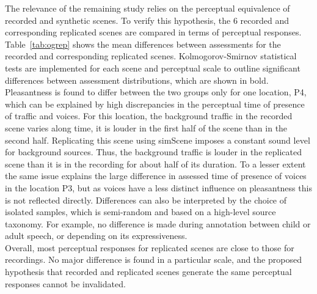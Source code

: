 \documentclass[11pt,a4paper]{article}
\begin{document}
The relevance of the remaining study relies on the perceptual equivalence of recorded and synthetic scenes. To verify this hypothesis, the 6 recorded and corresponding replicated scenes are compared in terms of perceptual responses.\\

Table~\ref{tab:ogrep} shows the mean differences between assessments for the recorded and corresponding replicated scenes. Kolmogorov-Smirnov statistical tests are implemented for each scene and perceptual scale to outline significant differences between assessment distributions, which are shown in bold. Pleasantness is found to differ between the two groups only for one location, P4, which can be explained by high discrepancies in the perceptual time of presence of traffic and voices. For this location, the background traffic in the recorded scene varies along time, it is louder in the first half of the scene than in the second half. Replicating this scene using simScene imposes a constant sound level for background sources. Thus, the background traffic is louder in the replicated scene than it is in the recording for about half
of its duration. To a lesser extent the same issue explains the large difference in assessed time of presence of voices in the location P3, but as voices have a less distinct influence on pleasantness this is not reflected directly. Differences can also be interpreted by the choice of isolated samples, which is semi-random and based on a high-level source taxonomy. For example, no difference is made during annotation between child or adult speech, or depending on its expressiveness.\\

Overall, most perceptual responses for replicated scenes are close to those for recordings. No major difference is found in a particular scale, and the proposed hypothesis that recorded and replicated scenes generate the same perceptual responses cannot be invalidated.
\end{document}
